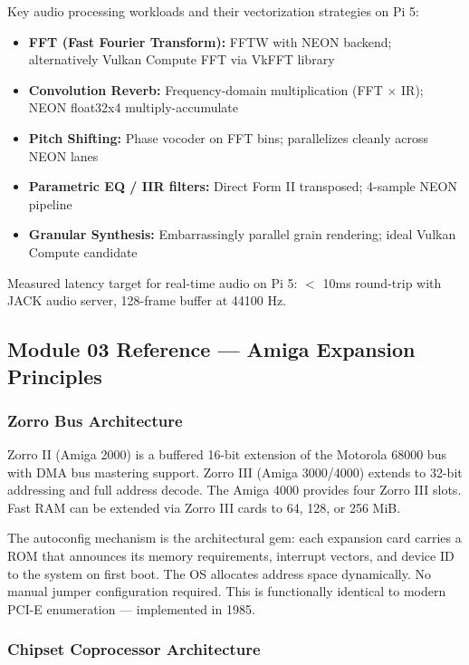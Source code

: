 \documentclass[11pt,letterpaper]{article}
\begin{document}
Key audio processing workloads and their vectorization strategies on Pi 5:

\begin{itemize}[noitemsep]
  \item \textbf{FFT (Fast Fourier Transform):} FFTW with NEON backend; alternatively Vulkan Compute FFT via VkFFT library
  \item \textbf{Convolution Reverb:} Frequency-domain multiplication (FFT $\times$ IR); NEON float32x4 multiply-accumulate
  \item \textbf{Pitch Shifting:} Phase vocoder on FFT bins; parallelizes cleanly across NEON lanes
  \item \textbf{Parametric EQ / IIR filters:} Direct Form II transposed; 4-sample NEON pipeline
  \item \textbf{Granular Synthesis:} Embarrassingly parallel grain rendering; ideal Vulkan Compute candidate
\end{itemize}

Measured latency target for real-time audio on Pi 5: $<$ 10ms round-trip with JACK audio server, 128-frame buffer at 44100 Hz.

\subsection{Module 03 Reference --- Amiga Expansion Principles}

\subsubsection{Zorro Bus Architecture}

Zorro II (Amiga 2000) is a buffered 16-bit extension of the Motorola 68000 bus with DMA bus mastering support. Zorro III (Amiga 3000/4000) extends to 32-bit addressing and full address decode. The Amiga 4000 provides four Zorro III slots. Fast RAM can be extended via Zorro III cards to 64, 128, or 256 MiB.

The autoconfig mechanism is the architectural gem: each expansion card carries a ROM that announces its memory requirements, interrupt vectors, and device ID to the system on first boot. The OS allocates address space dynamically. No manual jumper configuration required. This is functionally identical to modern PCI-E enumeration — implemented in 1985.

\subsubsection{Chipset Coprocessor Architecture}
\end{document}
